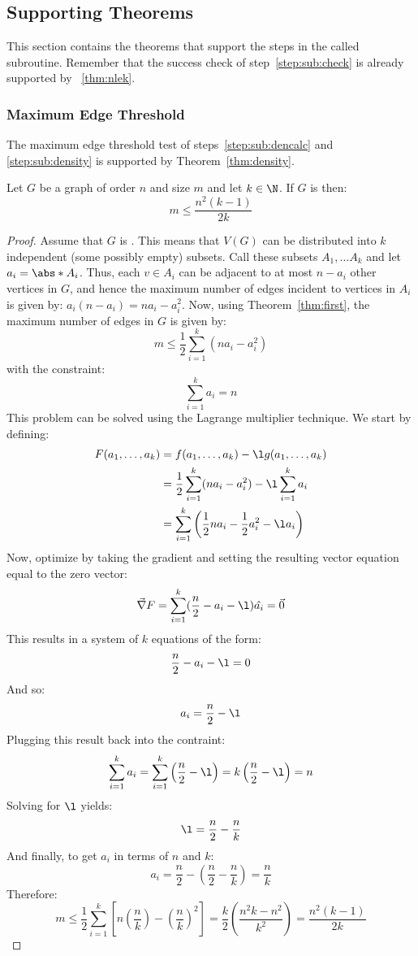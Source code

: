 \subsection{Supporting Theorems}\label{sec:sub:theorems}

This section contains the theorems that support the steps in the called subroutine.  Remember that the success
check of step~\ref{step:sub:check} is already supported by \theoremname~\ref{thm:nlek}.

\subsubsection{Maximum Edge Threshold}\label{sec:sub:sub:edges}

The maximum edge threshold test of steps~\ref{step:sub:dencalc} and \ref{step:sub:density} is supported by
Theorem~\ref{thm:density}.

\begin{theorem}
  \label{thm:density}
  Let \(G\) be a graph of order \(n\) and size \(m\) and let \(k\in\N\).  If \(G\) is  then:
  \[m\le\frac{n^2(k-1)}{2k}\]
\end{theorem}

\begin{proof}
  Assume that \(G\) is .  This means that \(V(G)\) can be distributed into \(k\) independent (some
  possibly empty) subsets.  Call these subsets \(A_1,\ldots A_k\) and let \(a_i=\abs*{A_i}\).  Thus, each \(v\in
  A_i\) can be adjacent to at most \(n-a_i\) other vertices in \(G\), and hence the maximum number of edges
  incident to vertices in \(A_i\) is given by: \(a_i(n-a_i)=na_i-a_i^2\).  Now, using Theorem~\ref{thm:first}, the
  maximum number of edges in \(G\) is given by:
  \[m\le\frac{1}{2}\sum_{i=1}^k(na_i-a_i^2)\]
  with the constraint:
  \[\sum_{i=1}^ka_i=n\]
  This problem can be solved using the Lagrange multiplier technique.  We start by defining:
  \begin{align*}
    F(a_1,\ldots,a_k) &= f(a_1,\ldots,a_k)-\l g(a_1,\ldots,a_k) \\
    &= \frac{1}{2}\sum_{i=1}^k(na_i-a_i^2)-\l\sum_{i=1}^ka_i \\
    &= \sum_{i=1}^k\left(\frac{1}{2}na_i-\frac{1}{2}a_i^2-\l a_i\right)
  \end{align*}
  Now, optimize by taking the gradient and setting the resulting vector equation equal to the zero vector:
  \[\vec{\nabla}F=\sum_{i=1}^k(\frac{n}{2}-a_i-\l)\hat{a_i}=\vec{0}\]
  This results in a system of \(k\) equations of the form:
  \[\frac{n}{2}-a_i-\l=0\]
  And so:
  \[a_i=\frac{n}{2}-\l\]
  Plugging this result back into the contraint:
  \[\sum_{i=1}^ka_i=\sum_{i=1}^k\left(\frac{n}{2}-\l\right)=k\left(\frac{n}{2}-\l\right)=n\]
  Solving for \(\l\) yields:
  \[\l=\frac{n}{2}-\frac{n}{k}\]
  And finally, to get \(a_i\) in terms of \(n\) and \(k\):
  \[a_i=\frac{n}{2}-\left(\frac{n}{2}-\frac{n}{k}\right)=\frac{n}{k}\]
  Therefore:
  \[m\le\frac{1}{2}\sum_{i=1}^k\left[n\left(\frac{n}{k}\right)-\left(\frac{n}{k}\right)^2\right]=
  \frac{k}{2}\left(\frac{n^2k-n^2}{k^2}\right)=\frac{n^2(k-1)}{2k}\]
\end{proof}

